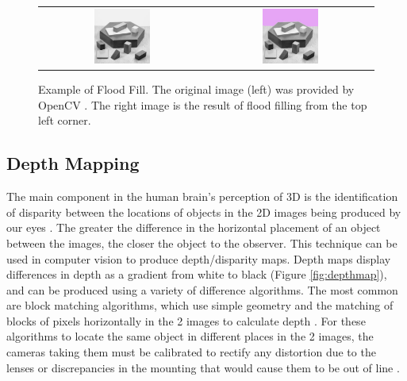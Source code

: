 \begin{figure}[H]
    \begin{center}
    \begin{tabular}{ c c }
        \includegraphics[width=0.35\textwidth]{Figures/blox.jpg} &
        \includegraphics[width=0.35\textwidth]{Figures/bloxFilled.jpg}
    \end{tabular}
    \caption[Example of Flood Fill]{Example of Flood Fill. The original image (left) was provided by OpenCV \cite{OpenCV}. The right image is the result of flood filling from the top left corner.}
    \label{fig:EgFloodFill}
    \end{center}
\end{figure}

\subsection{Depth Mapping}
\label{subsection:depth}

The main component in the human brain's perception of 3D is the identification of disparity between the locations of objects in the 2D images being produced by our eyes \cite{qian1997binocular}. The greater the difference in the horizontal placement of an object between the images, the closer the object to the observer. This technique can be used in computer vision to produce depth/disparity maps. Depth maps display differences in depth as a gradient from white to black (Figure \ref{fig:depthmap}), and can be produced using a variety of difference algorithms. The most common are block matching algorithms, which use simple geometry and the matching of blocks of pixels horizontally in the 2 images to calculate depth \cite{linda2001stockman}. For these algorithms to locate the same object in different places in the 2 images, the cameras taking them must be calibrated to rectify any distortion due to the lenses \cite{distort} or discrepancies in the mounting that would cause them to be out of line \cite{stereocal}.

